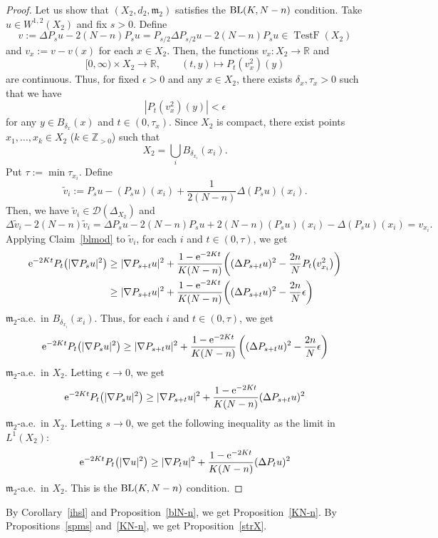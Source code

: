 \documentclass[10pt,a4paper]{amsart}
\numberwithin{equation}{section}
\theoremstyle{definition}
\newcommand{\TestF}{\operatorname{TestF}}
\newcommand{\R}{\mathbb{R}}
\newcommand{\Z}{\mathbb{Z}}
\newcommand{\mf}{\mathfrak{m}}
\newcommand{\BL}{{\rm BL}}
\newcommand{\D}{\mathcal{D}}
\begin{document}
\begin{proof}
Let us show that $(X_2,d_2,\mf_2)$ satisfies the $\BL(K,N-n)$ condition.
Take $u\in W^{1,2}(X_2)$ and fix $s>0$.
Define
\[
v:=\Delta P_s u-2(N-n)P_s u=P_{s/2}\Delta P_{s/2}u-2(N-n)P_s u\in \TestF(X_2)
\]
and $v_x:= v-v(x)$ for each $x\in X_2$.
Then, the functions $v_x\colon X_2\to \R$ and
\[
[0,\infty)\times X_2\to \R,\qquad
(t,y)\mapsto P_t(v_x^2)(y)
\]
are continuous.
Thus, for fixed $\epsilon>0$ and any $x\in X_2$, there exists $\delta_x,\tau_x>0$ such that
we have
\[
|P_t(v_x^2)(y)|<\epsilon
\]
for any $y\in B_{\delta_x}(x)$ and $t\in (0,\tau_x)$.
Since $X_2$ is compact, there exist points $x_1,\ldots, x_k\in X_2$ ($k\in \Z_{>0}$) such that
\[
X_2=\bigcup_{i}B_{\delta_{x_i}} (x_i).
\]
Put $\tau:=\min{\tau_{x_i}}$.
Define
\[
\tilde{v}_i:= P_s u-(P_s u)(x_i)+\frac{1}{2(N-n)}\Delta( P_s u)(x_i).
\]
Then, we have $\tilde{v}_i\in \D(\Delta_{X_2})$ and
\[
\Delta \tilde{v}_i-2(N-n)\tilde{v}_i=\Delta P_s u-2(N-n)P_s u+2(N-n)(P_s u)(x_i)-\Delta (P_s u)(x_i)=v_{x_i}.
\]
Applying Claim~\ref{blmod} to $\tilde{v}_i$, for each $i$ and $t\in (0,\tau)$, we get
\begin{align*}
{\rm e}^{-2K t}P_t\big(|\nabla P_s u|^2\big)&\geq |\nabla P_{s+t} u|^2+\frac{1-{\rm e}^{-2Kt}}{K(N-n)}\bigg( (\Delta P_{s+t} u)^2-\frac{2n}{N}P_t\big(v_{x_i}^2\big) \bigg)\\
&\geq |\nabla P_{s+t} u|^2+\frac{1-{\rm e}^{-2Kt}}{K(N-n)}\bigg( (\Delta P_{s+t} u)^2-\frac{2n}{N}\epsilon\bigg)
\end{align*}
$\mf_2$-a.e.\ in $B_{\delta_{x_i}}(x_i)$.
Thus, for each $i$ and $t\in (0,\tau)$, we get
\[
{\rm e}^{-2K t}P_t\big(|\nabla P_s u|^2\big)\geq|\nabla P_{s+t} u|^2+\frac{1-{\rm e}^{-2Kt}}{K(N-n)}\left((\Delta P_{s+t} u)^2-\frac{2n}{N}\epsilon\right)
\]
$\mf_2$-a.e.\ in $X_2$. Letting $\epsilon\to 0$, we get
\[
{\rm e}^{-2K t}P_t\big(|\nabla P_s u|^2\big)\geq|\nabla P_{s+t} u|^2+\frac{1-{\rm e}^{-2Kt}}{K(N-n)}(\Delta P_{s+t} u)^2
\]
$\mf_2$-a.e.\ in $X_2$.
Letting $s\to 0$, we get the following inequality as the limit in $L^1(X_2)$:
\[
{\rm e}^{-2K t}P_t\big(|\nabla u|^2\big)\geq|\nabla P_{t} u|^2+\frac{1-{\rm e}^{-2Kt}}{K(N-n)}(\Delta P_{t} u)^2
\]
$\mf_2$-a.e.\ in $X_2$. This is the $\BL(K,N-n)$ condition.
\end{proof}

By Corollary~\ref{ihsl} and Proposition~\ref{blN-n}, we get Proposition~\ref{KN-n}.
By Propositions~\ref{spms} and~\ref{KN-n}, we get Proposition~\ref{strX}.
\end{document}
